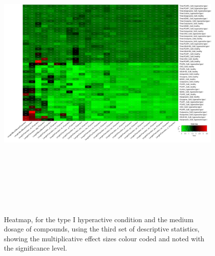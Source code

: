 \documentclass[a4paper,12pt]{article}
\begin{document}
\begin{figure}[h!]
\begin{center}
\includegraphics[width=16cm,height=15cm]{DarkApoHigh_heatmap_3_microM_DarkApoHigh_B1MAP.png}
\caption{Heatmap, for the type I hyperactive condition and the medium dosage of compounds, using the third set of descriptive statistics, showing the multiplicative effect sizes colour coded and noted with the significance level.}
\end{center}
\end{figure}
\newpage
\end{document}
